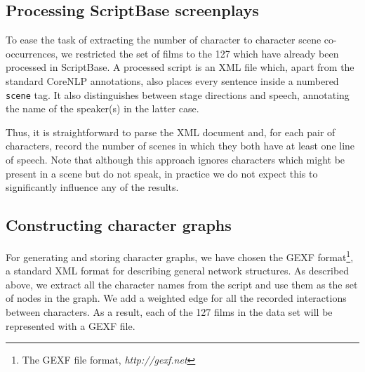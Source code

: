 \documentclass[bsc,frontabs,singlespacing,parskip, twoside]{infthesis}
\begin{document}
\subsection{Processing ScriptBase screenplays}
To ease the task of extracting the number of character to character scene co-occurrences, we restricted the set of films to the 127 which have already been processed in ScriptBase. A processed script is an XML file which, apart from the standard CoreNLP annotations, also places every sentence inside a numbered \texttt{scene} tag. It also distinguishes between stage directions and speech, annotating the name of the speaker(s) in the latter case.

Thus, it is straightforward to parse the XML document and, for each pair of characters, record the number of scenes in which they both have at least one line of speech. Note that although this approach ignores characters which might be present in a scene but do not speak, in practice we do not expect this to significantly influence any of the results.

\subsection{Constructing character graphs}
For generating and storing character graphs, we have chosen the GEXF format\footnote{The GEXF file format, \textit{http://gexf.net}}, a standard XML format for describing general network structures. As described above, we extract all the character names from the script and use them as the set of nodes in the graph. We add a weighted edge for all the recorded interactions between characters. As a result, each of the 127 films in the data set will be represented with a GEXF file.
\end{document}

